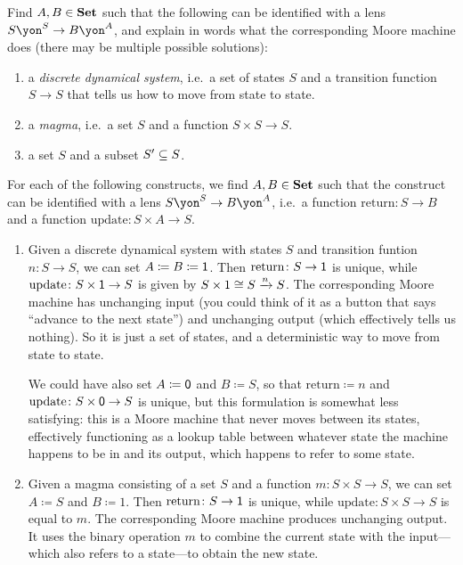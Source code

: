 \documentclass[Book-Poly]{subfiles}
\begin{document}
\begin{exercise}
Find $A,B\in\smset$ such that the following can be identified with a lens $S\yon^S\to B\yon^A$, and explain in words what the corresponding Moore machine does (there may be multiple possible solutions):
\begin{enumerate}
	\item a \emph{discrete dynamical system}, i.e.\ a set of states $S$ and a transition function $S\to S$ that tells us how to move from state to state.
	\item a \emph{magma}, i.e.\ a set $S$ and a function $S\times S\to S$.
	\item a set $S$ and a subset $S'\ss S$.\qedhere
\end{enumerate}
\begin{solution}
For each of the following constructs, we find $A, B \in \smset$ such that the construct can be identified with a lens $S\yon^S \to B\yon^A$, i.e.\ a function $\text{return} \colon S \to B$ and a function $\text{update} \colon S \times A \to S$.
\begin{enumerate}
    \item Given a discrete dynamical system with states $S$ and transition funtion $n \colon S \to S$, we can set $A \coloneqq B \coloneqq \1$.
    Then $\text{return} \colon S \to \1$ is unique, while $\text{update} \colon S \times \1 \to S$ is given by $S \times 1 \iso S \To{n} S$.
    The corresponding Moore machine has unchanging input (you could think of it as a button that says ``advance to the next state'') and unchanging output (which effectively tells us nothing).
    So it is just a set of states, and a deterministic way to move from state to state.
    
    We could have also set $A \coloneqq \0$ and $B \coloneqq S$, so that $\text{return} \coloneqq n$ and $\text{update} \colon S \times \0 \to S$ is unique, but this formulation is somewhat less satisfying: this is a Moore machine that never moves between its states, effectively functioning as a lookup table between whatever state the machine happens to be in and its output, which happens to refer to some state.
    
    \item Given a magma consisting of a set $S$ and a function $m \colon S \times S \to S$, we can set $A \coloneqq S$ and $B \coloneqq 1$.
    Then $\text{return} \colon S \to \1$ is unique, while $\text{update} \colon S \times S \to S$ is equal to $m$.
    The corresponding Moore machine produces unchanging output.
    It uses the binary operation $m$ to combine the current state with the input---which also refers to a state---to obtain the new state.
    

\end{enumerate}
\end{solution}
\end{exercise}
\end{document}
